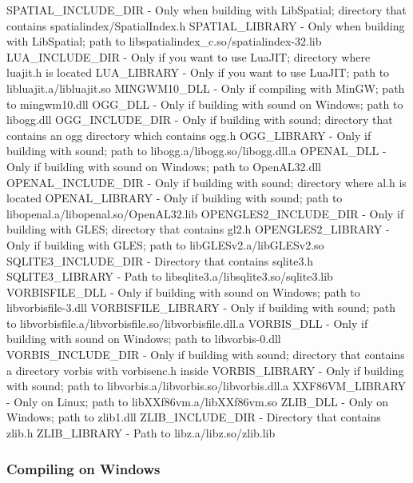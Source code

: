 \begin{DoxyVerb}
SPATIAL_INCLUDE_DIR             - Only when building with LibSpatial; directory that contains spatialindex/SpatialIndex.h
SPATIAL_LIBRARY                 - Only when building with LibSpatial; path to libspatialindex_c.so/spatialindex-32.lib
LUA_INCLUDE_DIR                 - Only if you want to use LuaJIT; directory where luajit.h is located
LUA_LIBRARY                     - Only if you want to use LuaJIT; path to libluajit.a/libluajit.so
MINGWM10_DLL                    - Only if compiling with MinGW; path to mingwm10.dll
OGG_DLL                         - Only if building with sound on Windows; path to libogg.dll
OGG_INCLUDE_DIR                 - Only if building with sound; directory that contains an ogg directory which contains ogg.h
OGG_LIBRARY                     - Only if building with sound; path to libogg.a/libogg.so/libogg.dll.a
OPENAL_DLL                      - Only if building with sound on Windows; path to OpenAL32.dll
OPENAL_INCLUDE_DIR              - Only if building with sound; directory where al.h is located
OPENAL_LIBRARY                  - Only if building with sound; path to libopenal.a/libopenal.so/OpenAL32.lib
OPENGLES2_INCLUDE_DIR           - Only if building with GLES; directory that contains gl2.h
OPENGLES2_LIBRARY               - Only if building with GLES; path to libGLESv2.a/libGLESv2.so
SQLITE3_INCLUDE_DIR             - Directory that contains sqlite3.h
SQLITE3_LIBRARY                 - Path to libsqlite3.a/libsqlite3.so/sqlite3.lib
VORBISFILE_DLL                  - Only if building with sound on Windows; path to libvorbisfile-3.dll
VORBISFILE_LIBRARY              - Only if building with sound; path to libvorbisfile.a/libvorbisfile.so/libvorbisfile.dll.a
VORBIS_DLL                      - Only if building with sound on Windows; path to libvorbis-0.dll
VORBIS_INCLUDE_DIR              - Only if building with sound; directory that contains a directory vorbis with vorbisenc.h inside
VORBIS_LIBRARY                  - Only if building with sound; path to libvorbis.a/libvorbis.so/libvorbis.dll.a
XXF86VM_LIBRARY                 - Only on Linux; path to libXXf86vm.a/libXXf86vm.so
ZLIB_DLL                        - Only on Windows; path to zlib1.dll
ZLIB_INCLUDE_DIR                - Directory that contains zlib.h
ZLIB_LIBRARY                    - Path to libz.a/libz.so/zlib.lib
\end{DoxyVerb}


\subsubsection*{Compiling on Windows}

